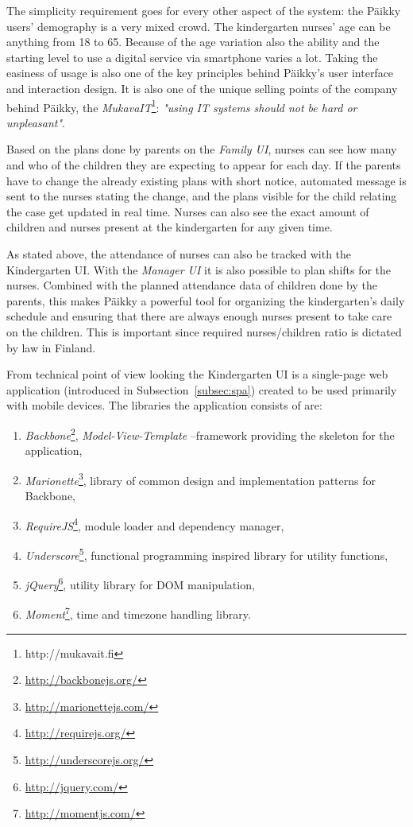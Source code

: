 The simplicity requirement goes for every other aspect of the system: the Päikky users' demography is a very mixed crowd. The kindergarten nurses' age can be anything from 18 to 65. Because of the age variation also the ability and the starting level to use a digital service via smartphone varies a lot. Taking the easiness of usage is also one of the key principles behind Päikky's user interface and interaction design. It is also one of the unique selling points of the company behind Päikky, the \textit{MukavaIT}\footnote{http://mukavait.fi}: \textit{"using IT systems should not be hard or unpleasant"}.

Based on the plans done by parents on the \textit{Family UI}, nurses can see how many and who of the children they are expecting to appear for each day. If the parents have to change the already existing plans with short notice, automated message is sent to the nurses stating the change, and the plans visible for the child relating the case get updated in real time. Nurses can also see the exact amount of children and nurses present at the kindergarten for any given time.

As stated above, the attendance of nurses can also be tracked with the Kindergarten UI. With the \textit{Manager UI} it is also possible to plan shifts for the nurses. Combined with the planned attendance data of children done by the parents, this makes Päikky a powerful tool for organizing the kindergarten's daily schedule and ensuring that there are always enough nurses present to take care on the children. This is important since required nurses/children ratio is dictated by law in Finland. %

From technical point of view looking the Kindergarten UI is a single-page web application (introduced in Subsection~\ref{subsec:spa}) created to be used primarily with mobile devices. The libraries the application consists of are: %

\begin{enumerate}
	\item \textit{Backbone}\footnote{\href{http://backbonejs.org/}{http://backbonejs.org/}}, \textit{Model-View-Template} --framework providing the skeleton for the application,
	\item \textit{Marionette}\footnote{\href{http://marionettejs.com/}{http://marionettejs.com/}}, library of common design and implementation patterns for Backbone,
	\item \textit{RequireJS}\footnote{\href{http://requirejs.org/}{http://requirejs.org/}}, module loader and dependency manager,
	\item \textit{Underscore}\footnote{\href{http://underscorejs.org/}{http://underscorejs.org/}}, functional programming inspired library for utility functions,
	\item \textit{jQuery}\footnote{\href{http://jquery.com/}{http://jquery.com/}}, utility library for DOM manipulation,
	\item \textit{Moment}\footnote{\href{http://momentjs.com/}{http://momentjs.com/}}, time and timezone handling library. 
\end{enumerate}


